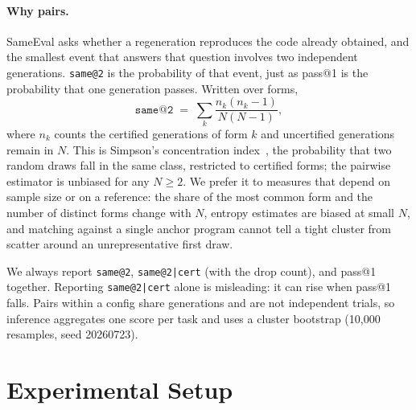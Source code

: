 \documentclass[acmsmall,screen,review,anonymous]{acmart}
\makeatletter
\newcommand{\sameeval}{SameEval}
\newcommand{\sameat}{\mbox{\texttt{same@2}}}
\newcommand{\sameatc}{\mbox{\texttt{same@2|cert}}}
\makeatother
\begin{document}
\paragraph{Why pairs.}
\sameeval{} asks whether a regeneration reproduces the code already obtained,
and the smallest event that answers that question involves two independent
generations.
\sameat{} is the probability of that event, just as pass@1 is the probability
that one generation passes.
Written over forms,
\[
  \texttt{same@2} \;=\; \sum_{k} \frac{n_k(n_k-1)}{N(N-1)},
\]
where $n_k$ counts the certified generations of form $k$ and uncertified
generations remain in $N$.
This is Simpson's concentration index~\cite{simpson1949measurement}, the
probability that two random draws fall in the same class, restricted to
certified forms; the pairwise estimator is unbiased for any $N{\ge}2$.
We prefer it to measures that depend on sample size or on a reference: the
share of the most common form and the number of distinct forms change with
$N$, entropy estimates are biased at small $N$, and matching against a single
anchor program cannot tell a tight cluster from scatter around an
unrepresentative first draw.

We always report \sameat{}, \sameatc{} (with the drop count), and pass@1
together.
Reporting \sameatc{} alone is misleading: it can rise when pass@1 falls.
Pairs within a config share generations and are not independent trials, so
inference aggregates one score per task and uses a cluster bootstrap
(10{,}000 resamples, seed 20260723).

\section{Experimental Setup}
\label{sec:setup}
\end{document}
